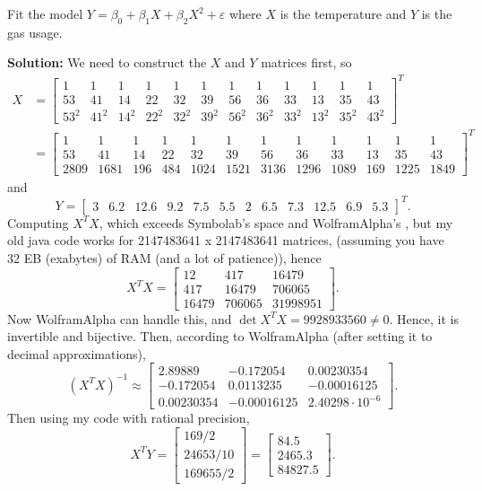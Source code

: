 Fit the model $Y = \beta_0 + \beta_1 X + \beta_2 X^2 + \varepsilon$ where $X$ is the temperature and $Y$ is the gas usage.

\nnl \textbf{Solution: } We need to construct the $X$ and $Y$ matrices first, so 
\begin{align*}
    X &= \begin{bmatrix}
        1 & 1 & 1 & 1 & 1 & 1 & 1 & 1 & 1 & 1 & 1 & 1\\
        53 & 41 & 14 & 22 & 32 & 39 & 56 & 36 & 33 & 13 & 35 & 43\\
        53^2 & 41^2 & 14^2 & 22^2 & 32^2 & 39^2 & 56^2 & 36^2 & 33^2 & 13^2 & 35^2 & 43^2
    \end{bmatrix}^T\\
    &= \begin{bmatrix}
        1 & 1 & 1 & 1 & 1 & 1 & 1 & 1 & 1 & 1 & 1 & 1\\
        53 & 41 & 14 & 22 & 32 & 39 & 56 & 36 & 33 & 13 & 35 & 43\\
        2809 & 1681 & 196 & 484 & 1024 & 1521 & 3136 & 1296 & 1089 & 169 & 1225 & 1849
    \end{bmatrix}^T
\end{align*}
and
$$Y = \begin{bmatrix}
    3 & 6.2 & 12.6 & 9.2& 7.5 & 5.5 & 2 & 6.5 & 7.3 & 12.5 & 6.9 & 5.3
\end{bmatrix}^T.$$
Computing $X^TX$, which exceeds Symbolab's space and WolframAlpha's , but my old java code works for 2147483641 x 2147483641 matrices, (assuming you have 32 EB (exabytes) of RAM (and a lot of patience)), hence
$$X^TX = \begin{bmatrix}
    12 & 417 & 16479\\
    417 & 16479 & 706065\\
    16479 & 706065 & 31998951
\end{bmatrix}.$$
Now WolframAlpha can handle this, and $\det X^TX = \num{9928933560} \neq 0$. Hence, it is invertible and bijective. Then, according to WolframAlpha (after setting it to decimal approximations), 
$$(X^TX)^{-1} \approx \begin{bmatrix}
    2.89889 & -0.172054 & 0.00230354\\
    -0.172054 & 0.0113235 & -0.00016125\\
    0.00230354 & -0.00016125 & 2.40298 \cdot 10^{-6}
\end{bmatrix}.$$
Then using my code with rational precision,
$$X^TY = \begin{bmatrix}
    169/2\\24653/10\\169655/2
\end{bmatrix} = \begin{bmatrix}
    84.5\\2465.3\\84827.5
\end{bmatrix}.$$
